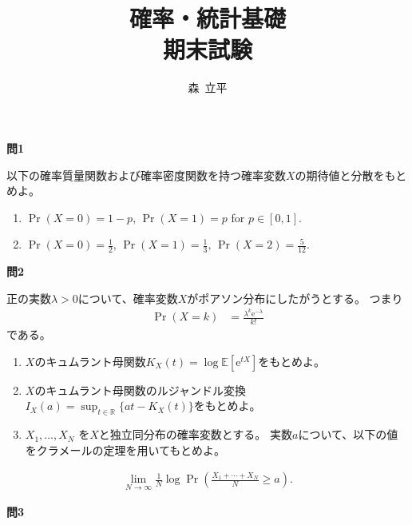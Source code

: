 \documentclass[lualatex,ja=standard,a4paper]{bxjsarticle}
\title{確率・統計基礎\\
期末試験}
\author{森~立平}
\date{}
\theoremstyle{definition}
\theoremstyle{remark}
\begin{document}
\maketitle


\vspace{1em}
{\noindent\large\bfseries 問1}

\vspace{1em}
以下の確率質量関数および確率密度関数を持つ確率変数$X$の期待値と分散をもとめよ。

\vspace{1em}
\begin{enumerate}[label=(\arabic*)]
\setlength{\itemsep}{1em}
\item
$\Pr(X=0)=1-p,\,\Pr(X=1)=p$ for $p\in[0,1]$.
\item
$\Pr(X=0)=\frac12,\,\Pr(X=1)=\frac13,\,\Pr(X=2)=\frac{5}{12}$.
\end{enumerate}

\vspace{1em}
{\noindent\large\bfseries 問2}

\vspace{1em}
正の実数$\lambda>0$について、確率変数$X$がポアソン分布にしたがうとする。
つまり
\begin{align*}
\Pr(X = k) &=  \frac{\lambda^k\mathrm{e}^{-\lambda}}{k!}
\end{align*}
である。
\vspace{1em}
\begin{enumerate}[label=(\arabic*)]
\setlength{\itemsep}{1em}
\item $X$のキュムラント母関数$K_X(t)=\log\mathbb{E}[\mathrm{e}^{tX}]$をもとめよ。
\item $X$のキュムラント母関数のルジャンドル変換$I_X(a) = \sup_{t\in\mathbb{R}}\{at - K_X(t)\}$をもとめよ。
\item $X_1,\dotsc,X_N$ を$X$と独立同分布の確率変数とする。
実数$a$について、以下の値をクラメールの定理を用いてもとめよ。
\end{enumerate}
\begin{align*}
\lim_{N\to\infty}\frac1N\log\Pr\left(\frac{X_1+\dotsb+X_N}{N} \ge a\right).
\end{align*}


\newpage
{\noindent\large\bfseries 問3}
\end{document}
